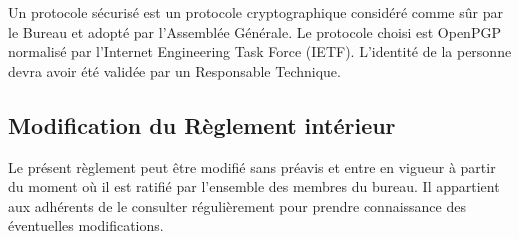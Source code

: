 \documentclass[12pt, a4paper]{article}
\begin{document}
	Un protocole sécurisé est un protocole cryptographique considéré comme sûr par
	le Bureau et adopté par l'Assemblée Générale. Le protocole choisi est OpenPGP
	normalisé par l'Internet Engineering Task Force (IETF). L'identité de la
	personne devra avoir été validée par un Responsable Technique.

    \subsection{Modification du Règlement intérieur}

    Le présent règlement peut être modifié sans préavis et entre en vigueur à partir
    du moment où il est ratifié par l'ensemble des membres du bureau. Il appartient
    aux adhérents de le consulter régulièrement pour prendre connaissance des
    éventuelles modifications.
\end{document}
